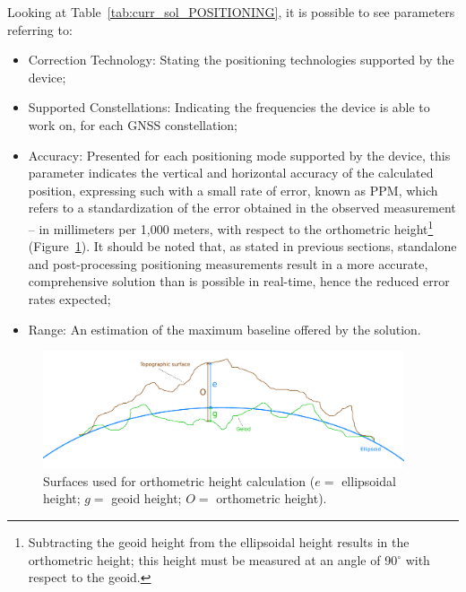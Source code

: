Looking at Table~\ref{tab:curr_sol_POSITIONING}, it is possible to see parameters referring to:
\begin{itemize}
    \item Correction Technology: Stating the positioning technologies supported by the device;
    \item Supported Constellations: Indicating the frequencies the device is able to work on, for each GNSS constellation;
    \item Accuracy: Presented for each positioning mode supported by the device, this parameter indicates the vertical and horizontal accuracy of the calculated position, expressing such with a small rate of error, known as PPM, which refers to a standardization of the error obtained in the observed measurement -- in millimeters per 1,000 meters, with respect to the orthometric height\footnote{Subtracting the geoid height from the ellipsoidal height results in the orthometric height; this height must be measured at an angle of 90$^{\circ}$ with respect to the \gls{geoid}.} (Figure~\ref{fig:orthometric_height}). It should be noted that, as stated in previous sections, standalone and post-processing positioning measurements result in a more accurate, comprehensive solution than is possible in real-time, hence the reduced error rates expected;
    \item Range: An estimation of the maximum baseline offered by the solution.
\end{itemize}
\begin{figure}[h]
    \centering
    \includegraphics[width=0.95\textwidth]{Chapters/Figures/orthometric_height.pdf}
    \caption{Surfaces used for orthometric height calculation ($e=$ ellipsoidal height; $g=$ geoid height; $O=$ orthometric height).}
    \label{fig:orthometric_height}
\end{figure}

